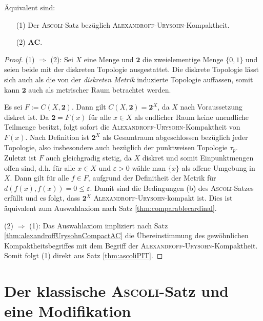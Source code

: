 \begin{thm}
  Äquivalent sind:
  \begin{enumerate}
    \item[(1)] Der \textsc{Ascoli}-Satz bezüglich \textsc{Alexandroff}\hyp{}\textsc{Urysohn}\hyp{}Kompaktheit.
    \item[(2)] $\mathbf{AC}$.
  \end{enumerate}
\end{thm}

\begin{proof}
  (1) $\Rightarrow$ (2): Sei $X$ eine Menge und $\mathbf{2}$ die zweielementige Menge $\{0,1\}$ und seien beide mit der diskreten Topologie ausgestattet. 
  Die diskrete Topologie lässt sich auch als die von der \textit{diskreten Metrik} induzierte Topologie auffassen, somit kann $\mathbf{2}$ auch als metrischer Raum betrachtet werden. 

  Es sei $F := C(X, \mathbf{2})$.
  Dann gilt $C(X, \mathbf{2}) = \mathbf{2}^X$, da $X$ nach Voraussetzung diskret ist.
  Da $\mathbf{2} = F(x)$ für alle $x \in X$ als endlicher Raum keine unendliche Teilmenge besitzt, folgt sofort die \textsc{Alexandroff}\hyp{}\textsc{Urysohn}\hyp{}Kompaktheit von $F(x)$.
  Nach Definition ist $\mathbf{2}^X$ als Gesamtraum abgeschlossen bezüglich jeder Topologie, also insbesondere auch bezüglich der punktweisen Topologie $\tau_p$.
  Zuletzt ist $F$ auch gleichgradig stetig, da $X$ diskret und somit Einpunktmengen offen sind, d.h. für alle $x \in X$ und $\varepsilon > 0$ wähle man $\{x\}$ als offene Umgebung in $X$. Dann gilt für alle $f \in F$, aufgrund der Definitheit der Metrik für  $d(f(x),f(x)) = 0 \leq \varepsilon$.
  Damit sind die Bedingungen (b) des \textsc{Ascoli}\hyp{}Satzes erfüllt und es folgt, dass $\mathbf{2}^X$ \textsc{Alexandroff}\hyp{}\textsc{Urysohn}\hyp{}kompakt ist. Dies ist äquivalent zum Auswahlaxiom nach Satz \ref{thm:comparablecardinal}.

  (2) $\Rightarrow$ (1): Das Auswahlaxiom impliziert nach Satz \ref{thm:alexandroffUrysohnCompactAC} die Übereinstimmung des gewöhnlichen Kompaktheitsbegriffes mit dem Begriff der \textsc{Alexandroff}\hyp{}\textsc{Urysohn}\hyp{}Kompaktheit. Somit folgt (1) direkt aus Satz \ref{thm:ascoliPIT}.
\end{proof}

\section{Der klassische \textsc{Ascoli}\hyp{}Satz und eine Modifikation}

